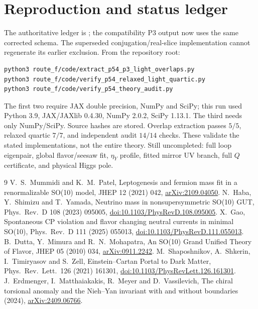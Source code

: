 \documentclass[11pt]{article}
\begin{document}
\section{Reproduction and status ledger}
The authoritative ledger is
;
the compatibility P3 output now uses the same corrected schema.
The superseded conjugation/real-slice implementation cannot regenerate
its earlier exclusion. From the repository root:
\begin{verbatim}
python3 route_f/code/extract_p54_p3_light_overlaps.py
python3 route_f/code/verify_p54_relaxed_light_quartic.py
python3 route_f/code/verify_p54_theory_audit.py
\end{verbatim}
The first two require JAX double precision, NumPy and SciPy; this run
used Python 3.9, JAX/JAXlib 0.4.30, NumPy 2.0.2, SciPy 1.13.1.
The third needs only NumPy/SciPy.
Source hashes are stored. Overlap extraction passes $5/5$, relaxed
quartic $7/7$, and independent audit $14/14$ checks.
These validate the stated implementations, not the entire theory.
Still uncompleted: full loop eigenpair, global flavor/seesaw fit,
$\eta_Y$ profile, fitted mirror UV branch, full $Q$ certificate,
and physical Higgs pole.

\begin{thebibliography}{9}
 V.~S.~Mummidi and K.~M.~Patel,
Leptogenesis and fermion mass fit in a renormalizable SO(10) model,
JHEP 12 (2021) 042,
\href{https://arxiv.org/abs/2109.04050}{arXiv:2109.04050}.
 N.~Haba, Y.~Shimizu and T.~Yamada,
Neutrino mass in nonsupersymmetric SO(10) GUT,
Phys.\ Rev.\ D 108 (2023) 095005,
\href{https://doi.org/10.1103/PhysRevD.108.095005}{doi:10.1103/PhysRevD.108.095005}.
 X.~Gao,
Spontaneous CP violation and flavor changing neutral currents in minimal
SO(10), Phys.\ Rev.\ D 111 (2025) 055013,
\href{https://doi.org/10.1103/PhysRevD.111.055013}{doi:10.1103/PhysRevD.111.055013}.
 B.~Dutta, Y.~Mimura and R.~N.~Mohapatra,
An SO(10) Grand Unified Theory of Flavor,
JHEP 05 (2010) 034,
\href{https://arxiv.org/abs/0911.2242}{arXiv:0911.2242}.
 M.~Shaposhnikov, A.~Shkerin, I.~Timiryasov and S.~Zell,
Einstein--Cartan Portal to Dark Matter,
Phys.\ Rev.\ Lett.\ 126 (2021) 161301,
\href{https://doi.org/10.1103/PhysRevLett.126.161301}{doi:10.1103/PhysRevLett.126.161301}.
 J.~Erdmenger, I.~Matthaiakakis, R.~Meyer and D.~Vassilevich,
The chiral torsional anomaly and the Nieh--Yan invariant with and without
boundaries (2024),
\href{https://arxiv.org/abs/2409.06766}{arXiv:2409.06766}.
\end{thebibliography}
\end{document}
